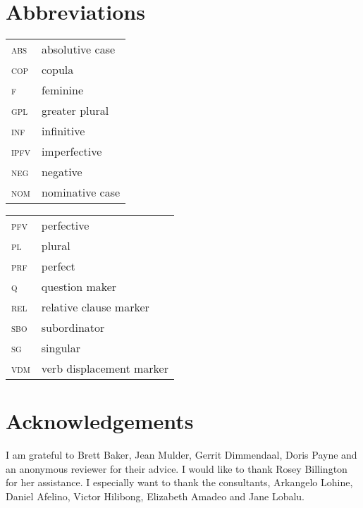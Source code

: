 \documentclass[output=paper]{langsci/langscibook}
\begin{document}
\section*{Abbreviations}
\begin{tabularx}{.45\textwidth}{lX}
\textsc{abs} & absolutive case \\

\textsc{cop} & copula \\

\textsc{f} & feminine \\

\textsc{gpl} & greater plural \\

\textsc{inf} & infinitive \\

\textsc{ipfv} & imperfective \\

\textsc{neg} & negative \\

\textsc{nom} & nominative case \\

\end{tabularx}
\begin{tabularx}{.45\textwidth}{lX}

\textsc{pfv} & perfective \\

\textsc{pl} & plural \\

\textsc{prf} & perfect \\

\textsc{q} & question maker \\

\textsc{rel} & relative clause marker \\

\textsc{sbo} &  subordinator \\

\textsc{sg} & singular \\

\textsc{vdm} & verb displacement marker \\
\end{tabularx}

\section*{Acknowledgements}

I am grateful to Brett Baker, Jean Mulder, Gerrit Dimmendaal, Doris Payne and an anonymous reviewer for their advice. I would like to thank Rosey Billington for her assistance. I especially want to thank the  consultants, Arkangelo Lohine, Daniel Afelino, Victor Hilibong, Elizabeth Amadeo and Jane Lobalu.

\printbibliography[heading=subbibliography,notkeyword=this]
\end{document}
